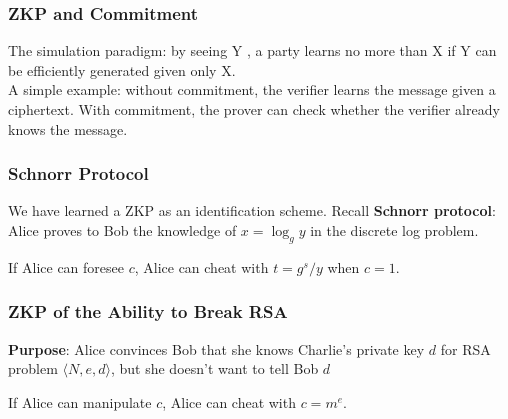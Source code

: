\begin{frame}\frametitle{ZKP and Commitment}
The simulation paradigm: by seeing Y , a party learns no more than X if Y can be efficiently generated given only X.\\
A simple example: without commitment, the verifier learns the message given a ciphertext. With commitment, the prover can check whether the verifier already knows the message.
\begin{figure}
\begin{center}

\end{center}
\end{figure}
\end{frame}
\begin{frame}\frametitle{Schnorr Protocol}
We have learned a ZKP as an identification scheme. Recall \textbf{Schnorr protocol}: Alice proves to Bob the knowledge of $x=\log_gy$ in the discrete log problem.
\begin{figure}
\begin{center}

\end{center}
\end{figure}
If Alice can foresee $c$, Alice can cheat with $t=g^s/y$ when $c=1$.
\end{frame}
\begin{frame}\frametitle{ZKP of the Ability to Break RSA}
\textbf{Purpose}: Alice convinces Bob that she knows Charlie's private key $d$ for RSA problem $\langle N,e,d \rangle$, but she doesn't want to tell Bob $d$
\begin{figure}
\begin{center}

\end{center}
\end{figure}
If Alice can manipulate $c$, Alice can cheat with $c = m^e$.
\end{frame}
